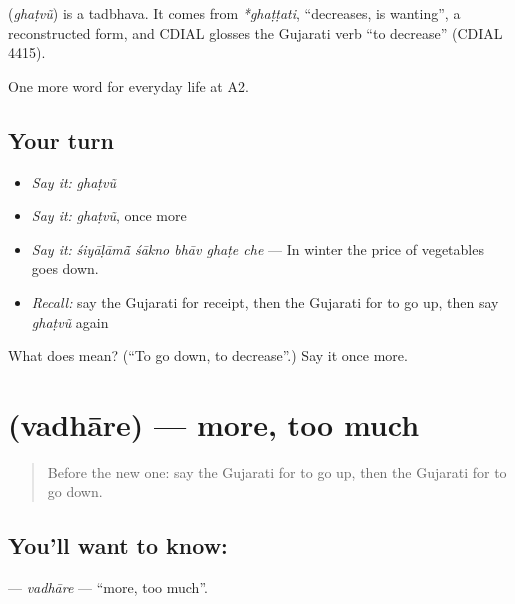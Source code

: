 \begin{cousinweb}
\textbf{} (\emph{ghaṭvũ}) is a tadbhava. It comes from \emph{*ghaṭṭati}, \textquotedblleft{}decreases, is wanting\textquotedblright{}, a reconstructed form, and CDIAL glosses the Gujarati verb \textquotedblleft{}to decrease\textquotedblright{} (CDIAL 4415).
\end{cousinweb}

\begin{grammarlens}[title={What you've built}]
One more word for everyday life at A2.
\end{grammarlens}

\subsection*{Your turn}
\begin{itemize}
\raggedright
  \item \emph{Say it:} \emph{ghaṭvũ}
  \item \emph{Say it:} \emph{ghaṭvũ}, once more
  \item \emph{Say it:} \emph{śiyāḷāmā̃ śākno bhāv ghaṭe che} — In winter the price of vegetables goes down.
  \item \emph{Recall:} say the Gujarati for receipt, then the Gujarati for to go up, then say \emph{ghaṭvũ} again
\end{itemize}

\begin{tcolorbox}[breakable,colback=teal!4,colframe=teal!35!black,title={Before you move on}]
What does  mean? (\textquotedblleft{}To go down, to decrease\textquotedblright{}.) Say it once more.
\end{tcolorbox}
\section[\texorpdfstring{\gu{વધારે} (vadhāre)}{વધારે (vadhāre)}]{ (vadhāre) — more, too much}

\label{lesson:GU-C187-vadhare}



\begin{quote}
Before the new one: say the Gujarati for to go up, then the Gujarati for to go down.
\end{quote}

\subsection*{You'll want to know: }
\textbf{} — \emph{vadhāre} — \textquotedblleft{}more, too much\textquotedblright{}.

